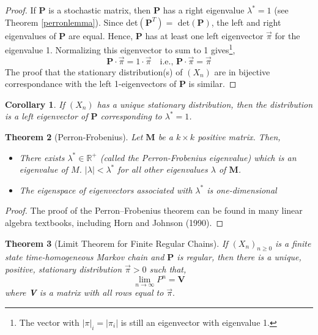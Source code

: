 \documentclass{tufte-handout}
\newtheorem{thm}{Theorem}
\newtheorem{cor}[thm]{Corollary}
\begin{document}
  \begin{proof}
    If $\boldsymbol{P}$ is a stochastic matrix, then $\boldsymbol{P}$ has a right eigenvalue $\lambda^* = 1$ (see Theorem \ref{perronlemma}). Since det$(\boldsymbol{P}^T) =$ det$(\boldsymbol{P})$, the left and right eigenvalues of $\boldsymbol{P}$ are equal. Hence, $\boldsymbol{P}$ has at least one left eigenvector $\Vec{\pi}$ for the eigenvalue 1. Normalizing this eigenvector to sum to 1 gives\footnote{The vector with $|\pi|_i = |\pi_i|$ is still an eigenvector with eigenvalue 1.},
    \[\boldsymbol{P} \cdot \Vec{\pi} = 1 \cdot \Vec{\pi} \quad \text{i.e., } \boldsymbol{P} \cdot \Vec{\pi} = \Vec{\pi}\]
    The proof that the stationary distribution(s) of $(X_n)$ are in bijective correspondance with the left 1-eigenvectors of $\boldsymbol{P}$ is similar.
  \end{proof}

  \begin{cor}
    If $(X_n)$ has a unique stationary distribution, then the distribution is a left eigenvector of $\boldsymbol{P}$ corresponding to $\lambda^* = 1$.
  \end{cor}

  \begin{thm}[Perron-Frobenius]
    Let $\boldsymbol{M}$ be a $k \times k$ positive matrix. Then,
    \begin{itemize}
      \item There exists $\lambda^* \in \mathbb{R}^+$ (called the Perron-Frobenius eigenvalue) which is an eigenvalue of $M$. $|\lambda| < \lambda^*$ for all other eigenvalues $\lambda$ of $\boldsymbol{M}$.
      \item The eigenspace of eigenvectors associated with $\lambda^*$ is one-dimensional
    \end{itemize}
  \end{thm}
  
  \begin{proof}
    The proof of the Perron–Frobenius theorem can be found in many linear algebra textbooks, including Horn and Johnson (1990).
  \end{proof}

  \begin{thm}[Limit Theorem for Finite Regular Chains]
    If $(X_n)_{n \geq 0}$ is a finite state time-homogeneous Markov chain and $\boldsymbol{P}$ is regular, then there is a unique, positive, stationary distribution $\Vec{\pi} > 0$ such that,
    \[ \lim_{n \rightarrow \infty} P^n = \boldsymbol{V}\]
    \noindent where \textbf{V} is a matrix with all rows equal to $\Vec{\pi}.$
  \end{thm}
\end{document}

